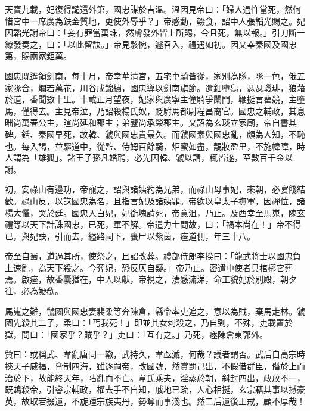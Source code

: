 \begin{pinyinscope}
 天寶九載，妃復得譴還外第，國忠謀於吉溫。溫因見帝曰：「婦人過忤當死，然何惜宮中一席廣為鈇金質地，更使外辱乎？」帝感動，輟食，詔中人張韜光賜之。妃因韜光謝帝曰：「妾有罪當萬誅，然膚發外皆上所賜，今且死，無以報。」引刀斷一繚發奏之，曰：「以此留訣。」帝見駭惋，遽召入，禮遇如初。因又幸秦國及國忠第，賜兩家鉅萬。



 國忠既遙領劍南，每十月，帝幸華清宮，五宅車騎皆從，家別為隊，隊一色，俄五家隊合，爛若萬花，川谷成錦繡，國忠導以劍南旗節。遺鈿墮舄，瑟瑟璣琲，狼藉於道，香聞數十里。十載正月望夜，妃家與廣寧主僮騎爭闤門，鞭挺言雚競，主墮馬，僅得去。主見帝泣，乃詔殺楊氏奴，貶駙馬都尉程昌裔官。國忠之輔政，其息昢尚萬春公主，暄尚延和郡主；弟鑒尚承榮郡主。又詔為玄琰立家廟，帝自書其碑。銛、秦國早死，故韓、虢與國忠貴最久。而虢國素與國忠亂，頗為人知，不恥也。每入謁，並驅道中，從監、侍姆百餘騎，炬蜜如盡，靚妝盈里，不施幃障，時人謂為「雄狐」。諸王子孫凡婚聘，必先因韓、虢以請，輒皆遂，至數百千金以謝。



 初，安祿山有邊功，帝寵之，詔與諸姨約為兄弟，而祿山母事妃，來朝，必宴餞結歡。祿山反，以誅國忠為名，且指言妃及諸姨罪。帝欲以皇太子撫軍，因禪位，諸楊大懼，哭於廷。國忠入白妃，妃銜塊請死，帝意沮，乃止。及西幸至馬嵬，陳玄禮等以天下計誅國忠，已死，軍不解。帝遣力士問故，曰：「禍本尚在！」帝不得已，與妃訣，引而去，縊路祠下，裹尸以紫茵，瘞道側，年三十八。



 帝至自蜀，道過其所，使祭之，且詔改葬。禮部侍郎李揆曰：「龍武將士以國忠負上速亂，為天下殺之。今葬妃，恐反仄自疑。」帝乃止。密遣中使者具棺槨它葬焉。啟瘞，故香囊猶在，中人以獻，帝視之，淒感流涕，命工貌妃於別殿，朝夕往，必為鯁欷。



 馬嵬之難，虢國與國忠妻裴柔等奔陳倉，縣令率吏追之，意以為賊，棄馬走林。虢國先殺其二子，柔曰：「丐我死！」即並其女刺殺之，乃自剄，不殊，吏載置於獄，問曰：「國家乎？賊乎？」吏曰：「互有之。」乃死，瘞陳倉東郭外。



 贊曰：或稱武、韋亂唐同一轍，武持久，韋亟滅，何哉？議者謂否。武后自高宗時挾天子威福，脅制四海，雖逐嗣帝，改國號，然賞罰己出，不假借群臣，僭於上而治於下，故能終天年，阽亂而不亡。韋氏乘夫，淫蒸於朝，斜封四出，政放不一，既鴆殺帝，引睿宗輔政，權去手不自知，戚地已疏，人心相挻，玄宗藉其事以撼豪英，故取若掇遺，不旋踵宗族夷丹，勢奪而事淺也。然二后遺後王戒，顧不厚哉！



\end{pinyinscope}